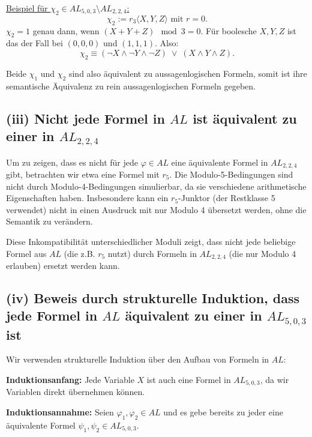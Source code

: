 \documentclass[12pt,a4paper]{article}
\begin{document}
\underline{Beispiel für $\chi_2 \in AL_{5,0,3} \setminus AL_{2,2,4}$:}
\[
\chi_2 := r_3\langle X,Y,Z \rangle \text{ mit } r=0.
\]
$\chi_2=1$ genau dann, wenn $(X+Y+Z)\mod 3=0$. Für boolesche $X,Y,Z$ ist das der Fall bei $(0,0,0)$ und $(1,1,1)$. Also:
\[
\chi_2 \equiv (\neg X \land \neg Y \land \neg Z)\;\lor\;(X \land Y \land Z).
\]

Beide $\chi_1$ und $\chi_2$ sind also äquivalent zu aussagenlogischen Formeln, somit ist ihre semantische Äquivalenz zu rein aussagenlogischen Formeln gegeben.

\subsection*{(iii) Nicht jede Formel in $AL$ ist äquivalent zu einer in $AL_{2,2,4}$}

Um zu zeigen, dass es nicht für jede $\varphi \in AL$ eine äquivalente Formel in $AL_{2,2,4}$ gibt, betrachten wir etwa eine Formel mit $r_5$. Die Modulo-5-Bedingungen sind nicht durch Modulo-4-Bedingungen simulierbar, da sie verschiedene arithmetische Eigenschaften haben. Insbesondere kann ein $r_5$-Junktor (der Restklasse 5 verwendet) nicht in einen Ausdruck mit nur Modulo 4 übersetzt werden, ohne die Semantik zu verändern.

Diese Inkompatibilität unterschiedlicher Moduli zeigt, dass nicht jede beliebige Formel aus $AL$ (die z.B. $r_5$ nutzt) durch Formeln in $AL_{2,2,4}$ (die nur Modulo 4 erlauben) ersetzt werden kann.

\subsection*{(iv) Beweis durch strukturelle Induktion, dass jede Formel in $AL$ äquivalent zu einer in $AL_{5,0,3}$ ist}

Wir verwenden strukturelle Induktion über den Aufbau von Formeln in $AL$:

\textbf{Induktionsanfang:}  
Jede Variable $X$ ist auch eine Formel in $AL_{5,0,3}$, da wir Variablen direkt übernehmen können.

\textbf{Induktionsannahme:}  
Seien $\varphi_1, \varphi_2 \in AL$ und es gebe bereits zu jeder eine äquivalente Formel $\psi_1,\psi_2 \in AL_{5,0,3}$.
\end{document}
